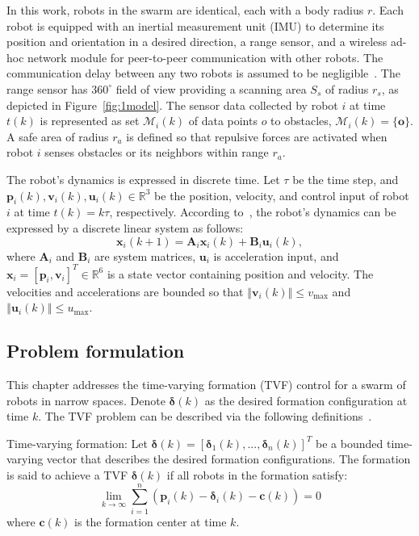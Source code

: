 In this work, robots in the swarm are identical, each with a body radius $r$. Each robot is equipped with an inertial measurement unit (IMU) to determine its position and orientation in a desired direction, a range sensor, and a wireless ad-hoc network module for peer-to-peer communication with other robots. The communication delay between any two robots is assumed to be negligible~\cite{AlonsoMora2018,9527169}. The range sensor has $360^\circ$ field of view providing a scanning area $S_s$ of radius $r_s$, as depicted in Figure~\ref{fig:1model}. The sensor data collected by robot $i$ at time $t(k)$ is represented as set $\mathcal{M}_i(k)$ of data points $o$ to obstacles, $\mathcal{M}_i(k) = \{\mathbf{o}\}$. A safe area of radius $r_a$ is defined so that repulsive forces are activated when robot $i$ senses obstacles or its neighbors within range $r_a$.

The robot's dynamics is expressed in discrete time. Let $\tau$ be the time step, and $\mathbf{p}_i(k), \mathbf{v}_i(k), \mathbf{u}_i(k) \in \mathbb{R}^3$  be the position, velocity, and control input of robot $i$ at time $t(k) = k\tau$, respectively. According to~\cite{Dong2015}, the robot's dynamics can be expressed by a discrete linear system as follows:
\begin{equation}
    \mathbf{x}_i(k+1)=\mathbf{A}_i\mathbf{x}_i(k) + \mathbf{B}_i\mathbf{u}_i(k),
    \label{eqn:1model}
\end{equation}
where $\mathbf{A}_i$ and $\mathbf{B}_i$ are system matrices, $\mathbf{u}_i$ is  acceleration input, and  $\mathbf{x}_i=\left[\mathbf{p}_i,\mathbf{v}_i\right]^T\in\mathbb{R}^6$ is a state vector containing position and velocity. The velocities and accelerations are bounded so that $\left\Vert \mathbf{v}_i(k)\right\Vert\leq v_\text{max}$ and $\left\Vert \mathbf{u}_i(k)\right\Vert\leq u_\text{max}$.

\subsection{Problem formulation}

This chapter addresses the time-varying formation (TVF) control for a swarm of robots in narrow spaces. Denote $\mathbf{\delta}(k)$ as the desired formation configuration at time $k$. The TVF problem can be described via the following definitions~\cite{Dong2015,Dong2016}.

\begin{definition}\label{def_tvf}
Time-varying formation:  Let $\mathbf{\delta}(k)=\left[\mathbf{\delta}_1(k),...,\mathbf{\delta}_n(k)\right]^T$ be a bounded time-varying vector that describes the desired formation configurations. The formation is said to achieve a TVF $\mathbf{\delta}(k)$ if all robots in the formation satisfy:
\begin{equation}
    \lim_{k\to\infty}\sum_{i=1}^n\left( \mathbf{p}_i(k)-\mathbf{\delta}_i(k)-\mathbf{c}(k)\right)=0
\end{equation}
where $\mathbf{c}(k)$ is the formation center at time $k$.
\end{definition}

